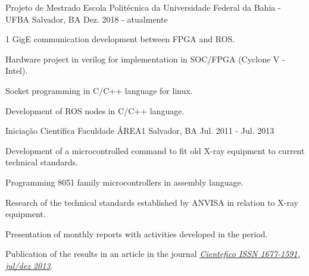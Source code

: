 \begin{cventries}
  \cventry
    {Projeto de Mestrado} %
    {Escola Politécnica da Universidade Federal da Bahia - UFBA} %
    {Salvador, BA} %
    {Dez. 2018 - atualmente} %
    {
      \begin{cvitems} %
        \item {1 GigE communication development between FPGA and ROS.}
        \item {Hardware project in verilog for implementation in SOC/FPGA (Cyclone V - Intel).}
        \item {Socket programming in C/C++ language for linux.}
        \item {Development of ROS nodes in C/C++ language.}
      \end{cvitems}
    }

  \cventry
    {Iniciação Científica} %
    {Faculdade ÁREA1} %
    {Salvador, BA} %
    {Jul. 2011 - Jul. 2013} %
    {
      \begin{cvitems} %
        \item {Development of a microcontrolled command to fit old X-ray equipment to current technical standards.}
        \item {Programming 8051 family microcontrollers in assembly language.}
        \item {Research of the technical standards established by ANVISA in relation to X-ray equipment.}
        \item {Presentation of monthly reports with activities developed in the period.}
        \item {Publication of the results in an article in the journal \underline{\href{https://cientefico.emnuvens.com.br/cientefico/article/view/58}{\emph{Cientefico ISSN 1677-1591, jul/dez 2013}}}.}
      \end{cvitems}
    }
    

\end{cventries}

